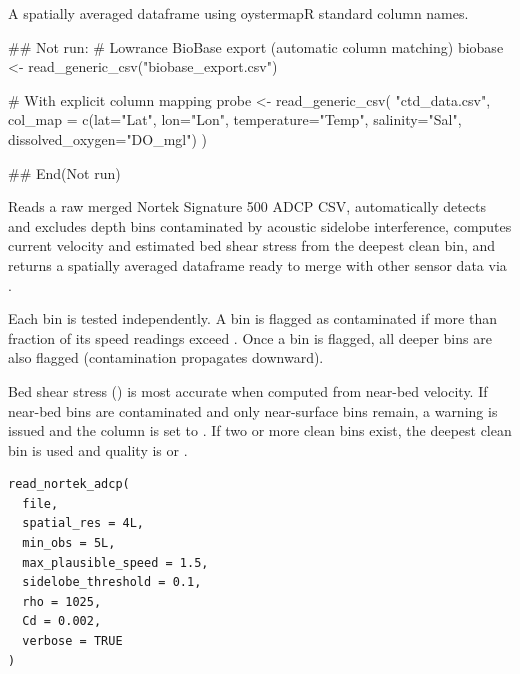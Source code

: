 \documentclass[a4paper]{book}
\begin{document}
%
\begin{Value}
A spatially averaged dataframe using oystermapR standard column names.
\end{Value}
%
\begin{Examples}
\begin{ExampleCode}
## Not run: 
# Lowrance BioBase export (automatic column matching)
biobase <- read_generic_csv("biobase_export.csv")

# With explicit column mapping
probe <- read_generic_csv(
  "ctd_data.csv",
  col_map = c(lat="Lat", lon="Lon", temperature="Temp", salinity="Sal",
              dissolved_oxygen="DO_mgl")
)

## End(Not run)
\end{ExampleCode}
\end{Examples}
%
\begin{Description}
Reads a raw merged Nortek Signature 500 ADCP CSV, automatically detects
and excludes depth bins contaminated by acoustic sidelobe interference,
computes current velocity and estimated bed shear stress from the deepest
clean bin, and returns a spatially averaged dataframe ready to merge with
other sensor data via .

 Each bin is tested independently. A bin is flagged
as contaminated if more than  fraction of its speed
readings exceed . Once a bin is flagged, all deeper
bins are also flagged (contamination propagates downward).

 Bed shear stress ()
is most accurate when computed from near-bed velocity. If near-bed bins are
contaminated and only near-surface bins remain, a warning is issued and the
 column is set to . If two or more clean bins
exist, the deepest clean bin is used and quality is  or
.
\end{Description}
%
\begin{Usage}
\begin{verbatim}
read_nortek_adcp(
  file,
  spatial_res = 4L,
  min_obs = 5L,
  max_plausible_speed = 1.5,
  sidelobe_threshold = 0.1,
  rho = 1025,
  Cd = 0.002,
  verbose = TRUE
)
\end{verbatim}
\end{Usage}
\end{document}
